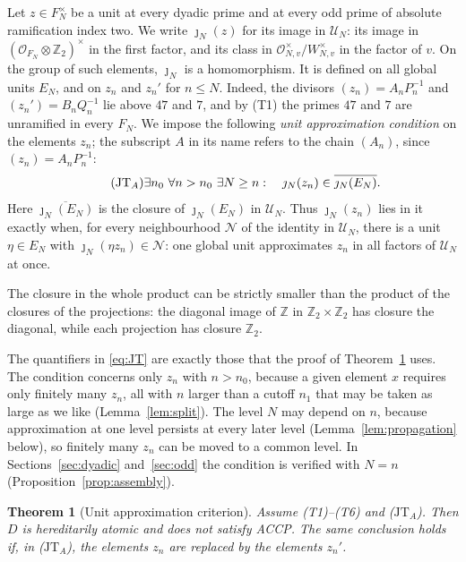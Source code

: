 \documentclass[11pt]{article}
\theoremstyle{plain}
\newtheorem{theorem}{Theorem}[section]
\theoremstyle{definition}
\theoremstyle{remark}
\newcommand{\Z}{\mathbb Z}
\newcommand{\OO}{\mathcal O}
\begin{document}
Let $z\in F_N^\times$ be a unit at every dyadic prime and at every odd
prime of absolute ramification index two.  We write $\jmath_N(z)$ for its
image in $\mathcal U_N$: its image in $(\OO_{F_N}\otimes\Z_2)^\times$ in
the first factor, and its class in $\OO_{N,v}^\times/W_{N,v}^\times$ in
the factor of $v$.  On the group of such elements, $\jmath_N$ is a
homomorphism.  It is defined on all global units $E_N$, and on $z_n$ and
$z_n'$ for $n\le N$.  Indeed, the divisors $(z_n)=A_nP_n^{-1}$ and
$(z_n')=B_nQ_n^{-1}$ lie above $47$ and $7$, and by (T1) the primes $47$
and $7$ are unramified in every $F_N$.  We impose the following
\emph{unit approximation condition} on the elements $z_n$; the subscript
$A$ in its name refers to the chain $(A_n)$, since $(z_n)=A_nP_n^{-1}$:
\begin{equation}\label{eq:JT}
 \tag{$\mathrm{JT}_A$}
 \exists n_0\ \forall n>n_0\ \exists N\geq n:
 \quad\jmath_N(z_n)\in\overline{\jmath_N(E_N)}.
\end{equation}
Here $\overline{\jmath_N(E_N)}$ is the closure of $\jmath_N(E_N)$ in
$\mathcal U_N$.  Thus $\jmath_N(z_n)$ lies in it exactly when, for every
neighbourhood $\mathcal N$ of the identity in $\mathcal U_N$, there is a
unit $\eta\in E_N$ with $\jmath_N(\eta z_n)\in\mathcal N$: one global unit
approximates $z_n$ in all factors of $\mathcal U_N$ at once.

The closure in the whole product can be strictly smaller than the product
of the closures of the projections: the diagonal image of $\Z$ in
$\Z_2\times\Z_2$ has closure the diagonal, while each projection has
closure $\Z_2$.

The quantifiers in \eqref{eq:JT} are exactly those that the proof of
Theorem~\ref{thm:joint} uses.  The condition concerns only $z_n$ with
$n>n_0$, because a given element $x$ requires only finitely many $z_n$,
all with $n$ larger than a cutoff $n_1$ that may be taken as large as we
like (Lemma~\ref{lem:split}).  The level $N$ may depend on $n$, because
approximation at one level persists at every later level
(Lemma~\ref{lem:propagation} below), so finitely many $z_n$ can be moved
to a common level.  In Sections~\ref{sec:dyadic} and~\ref{sec:odd} the
condition is verified with $N=n$ (Proposition~\ref{prop:assembly}).

\begin{theorem}[Unit approximation criterion]\label{thm:joint}
Assume \textup{(T1)--(T6)} and \textup{($\mathrm{JT}_A$)}.  Then $D$ is
hereditarily atomic and does not satisfy ACCP.  The same conclusion holds
if, in \textup{($\mathrm{JT}_A$)}, the elements $z_n$ are replaced by the
elements $z_n'$.
\end{theorem}
\end{document}
